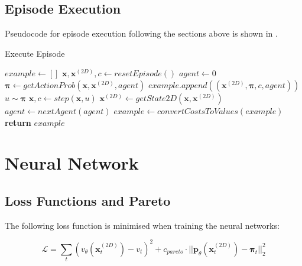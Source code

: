 \documentclass[../main.tex]{subfiles}
\begin{document}
\subsection{Episode Execution}

Pseudocode for episode execution following the sections above is shown in .

\begin{algorithm}
   \caption{Execute Episode}
   \label{alg:executeEpisode}
   \begin{algorithmic}[1]
      \State $example \leftarrow []$
      \State $\boldsymbol{x}, \boldsymbol{x}^{(2D)}, c \leftarrow resetEpisode()$
      \State $agent\leftarrow 0$
      \Repeat
         \State $\boldsymbol{\pi} \leftarrow getActionProb(\boldsymbol{x}, \boldsymbol{x}^{(2D)}, agent)$
         \State $example.append((\boldsymbol{x}^{(2D)}, \boldsymbol{\pi}, c, agent))$
         \State $u \sim \boldsymbol{\pi}$
         \State $\boldsymbol{x}, c \leftarrow step(\boldsymbol{x}, u)$
         \State $\boldsymbol{x}^{(2D)} \leftarrow getState2D(\boldsymbol{x}, \boldsymbol{x}^{(2D)})$
         \State $agent \leftarrow nextAgent(agent)$
      \State $example \leftarrow convertCostsToValues(example)$
      \State \textbf{return} $example$
      \EndFunction
   \end{algorithmic}
\end{algorithm}

\section{Neural Network}
\subsection{Loss Functions and Pareto}

The following loss function is minimised when training the neural networks:

\begin{equation}
   \mathcal{L} = \sum_t (v_\theta (\boldsymbol{x}^{(2D)}_t) - v_t)^2 + c_{pareto} \cdot ||\boldsymbol{p}_\theta(\boldsymbol{x}^{(2D)}_t) - \boldsymbol{\pi}_t||^2_2
\end{equation}
\end{document}
